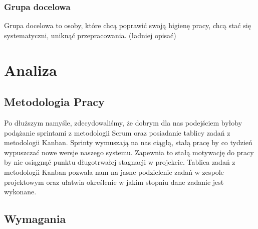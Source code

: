 \documentclass[a4paper,11pt]{report}
\begin{document}
\subsection {Grupa docelowa}
Grupa docelowa to osoby, które chcą poprawić swoją higienę pracy, chcą stać się systematyczni, uniknąć przepracowania. (ładniej opisać)
\chapter {Analiza}
\section{Metodologia Pracy}
Po dłuższym namyśle, zdecydowaliśmy, że dobrym dla nas podejściem byłoby podążanie sprintami z metodologii Scrum oraz posiadanie tablicy zadań z metodologii Kanban\cite{agile}.  Sprinty wymuszają na nas ciągłą, stałą pracę by co tydzień wypuszczać nowe wersje naszego systemu. Zapewnia to stałą motywację do pracy by nie osiągnąć punktu długotrwałej stagnacji w projekcie. Tablica zadań z metodologii Kanban pozwala nam na jasne podzielenie zadań w zespole projektowym oraz ułatwia określenie w jakim stopniu dane zadanie jest wykonane.

\section {Wymagania}
\end{document}
